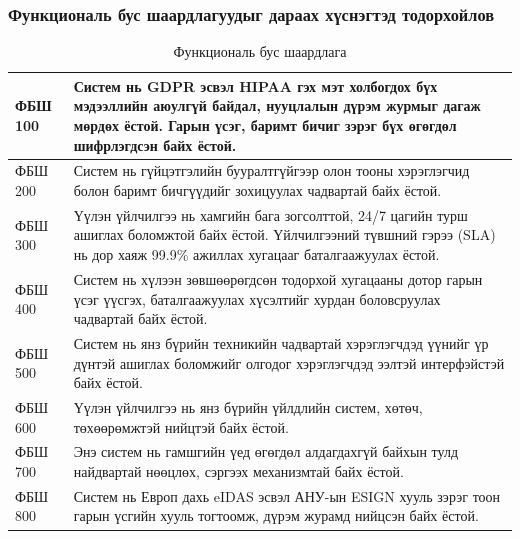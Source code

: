 \subsubsection{Функциональ бус шаардлагуудыг дараах хүснэгтэд тодорхойлов}
\begin{table}[h!]
	\centering
	\caption{Функциональ бус шаардлага}
	\begin{tabular}{ |p{2cm}|p{13cm}| }
		\hline
		ФБШ 100 & Систем нь GDPR эсвэл HIPAA гэх мэт холбогдох бүх мэдээллийн аюулгүй байдал, нууцлалын дүрэм журмыг дагаж мөрдөх ёстой. Гарын үсэг, баримт бичиг зэрэг бүх өгөгдөл шифрлэгдсэн байх ёстой. \\ \hline
		ФБШ 200 & Систем нь гүйцэтгэлийн бууралтгүйгээр олон тооны хэрэглэгчид болон баримт бичгүүдийг зохицуулах чадвартай байх ёстой.                                                                     \\ \hline
		ФБШ 300 & Үүлэн үйлчилгээ нь хамгийн бага зогсолттой, 24/7 цагийн турш ашиглах боломжтой байх ёстой. Үйлчилгээний түвшний гэрээ (SLA) нь дор хаяж 99.9\% ажиллах хугацааг баталгаажуулах ёстой.     \\ \hline
		ФБШ 400 & Систем нь хүлээн зөвшөөрөгдсөн тодорхой хугацааны дотор гарын үсэг үүсгэх, баталгаажуулах хүсэлтийг хурдан боловсруулах чадвартай байх ёстой.                                             \\ \hline
		ФБШ 500 & Систем нь янз бүрийн техникийн чадвартай хэрэглэгчдэд үүнийг үр дүнтэй ашиглах боломжийг олгодог хэрэглэгчдэд ээлтэй интерфэйстэй байх ёстой.                                             \\ \hline
		ФБШ 600 & Үүлэн үйлчилгээ нь янз бүрийн үйлдлийн систем, хөтөч, төхөөрөмжтэй нийцтэй байх ёстой.                                                                                                    \\  \hline
		ФБШ 700 & Энэ систем нь гамшгийн үед өгөгдөл алдагдахгүй байхын тулд найдвартай нөөцлөх, сэргээх механизмтай байх ёстой.                                                                            \\ \hline
		ФБШ 800 & Систем нь Европ дахь eIDAS эсвэл АНУ-ын ESIGN хууль зэрэг тоон гарын үсгийн хууль тогтоомж, дүрэм журамд нийцсэн байх ёстой.                                                              \\ \hline
	\end{tabular}
\end{table}
\newpage
